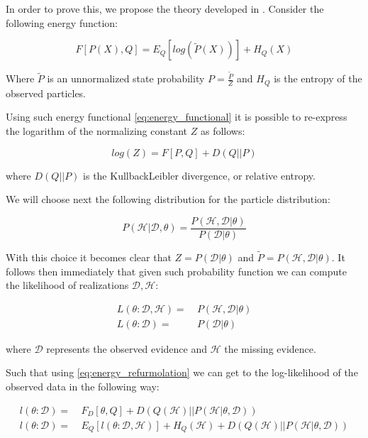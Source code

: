 \documentclass[11pt]{article}
\begin{document}
\begin{article}
In order to prove this, we propose the theory developed in
\cite{koller2009probabilistic}. Consider the following energy
function:

\begin{equation} \label{eq:energy_functional}
F[P(X), Q] = E_Q[log (\tilde{P}(X))] + H_Q (X)
\end{equation}

Where \(\tilde{P}\) is an unnormalized state probability \(P =
   \frac{\tilde{P}}{Z}\) and \(H_Q\) is the entropy of the observed
particles. 

Using such energy functional \ref{eq:energy_functional} it is possible
to re-express the logarithm of the normalizing constant \(Z\) as
follows:

\begin{equation} \label{eq:energy_refurmolation}
log (Z) = F[P, Q] + D (Q||P)
\end{equation}

where $D(Q||P)$ is the Kullback\textendash Leibler divergence, or relative
entropy.

We will choose next the following distribution for the particle
distribution:

\begin{equation} \label{eq:particle_distribution}
P (\mathscr{H} | \mathscr{D}, \theta) =   \frac{P (\mathscr{H}, \mathscr{D}| \theta)}{P (\mathscr{D}| \theta)}
\end{equation}

With this choice it becomes clear that \(Z = P (\mathscr{D}|
   \theta)\) and \(\tilde{P} = P (\mathscr{H}, \mathscr{D}| \theta)\). It
follows then immediately that given such probability function we
can compute the likelihood of realizations \(\mathscr{D}, \mathscr{H}\):

\begin{align} \label{eq:likelihood_particle}
L (\theta: \mathscr{D}, \mathscr{H}) =& \  P (\mathscr{H}, \mathscr{D}| \theta)\\
L (\theta: \mathscr{D}) =& \ P (\mathscr{D}| \theta)
\end{align}

where \(\mathscr{D}\) represents the observed evidence and
\(\mathscr{H}\) the missing evidence.

Such that using \ref{eq:energy_refurmolation} we can get to the
log-likelihood of the observed data in the following way:

\begin{align} \label{eq:likelihood_energy_functional_relation}
l (\theta: \mathscr{D}) =& \  F_D[\theta, Q] + D (Q (\mathscr{H}) || P (\mathscr{H}| \theta, \mathscr{D})) \\
l (\theta: \mathscr{D}) =& \  E_Q[l (\theta: \mathscr{D}, \mathscr{H})]+ H_Q (\mathscr {H}) + D (Q (\mathscr{H}) || P (\mathscr{H}| \theta, \mathscr{D}))
\end{align}


\end{article}
\end{document}
